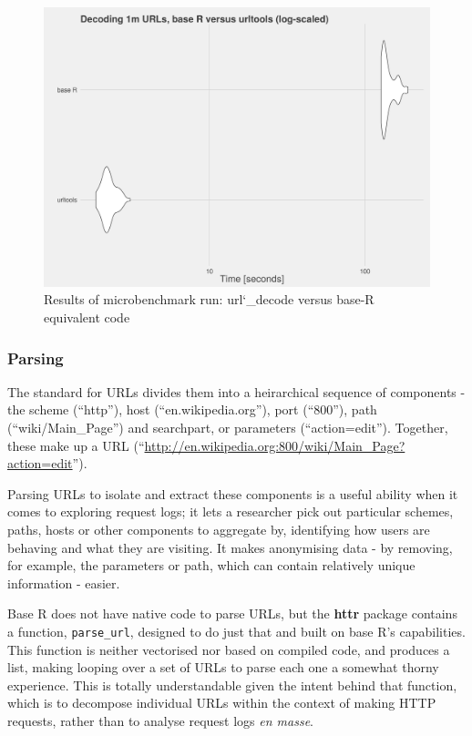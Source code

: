 \begin{figure}[h]
    \centering
    \includegraphics[scale=0.4]{decoding_benchmarks}
    \caption{Results of microbenchmark run: url\char`_decode versus base-R equivalent code}
\end{figure}

\subsubsection{Parsing}\label{parsing}

The standard for URLs \citep{RFC1738} divides them into a heirarchical
sequence of components - the scheme (``http''), host
(``en.wikipedia.org''), port (``800''), path (``wiki/Main\_Page'') and
searchpart, or parameters (``action=edit''). Together, these make up a
URL (``\url{http://en.wikipedia.org:800/wiki/Main_Page?action=edit}'').

Parsing URLs to isolate and extract these components is a useful ability
when it comes to exploring request logs; it lets a researcher pick out
particular schemes, paths, hosts or other components to aggregate by,
identifying how users are behaving and what they are visiting. It makes
anonymising data - by removing, for example, the parameters or path,
which can contain relatively unique information - easier.

Base R does not have native code to parse URLs, but the \textbf{httr}
package \citep{httr} contains a function, \texttt{parse\_url}, designed
to do just that and built on base R's capabilities. This function is
neither vectorised nor based on compiled code, and produces a list,
making looping over a set of URLs to parse each one a somewhat thorny
experience. This is totally understandable given the intent behind that
function, which is to decompose individual URLs within the context of
making HTTP requests, rather than to analyse request logs \emph{en
masse}.

